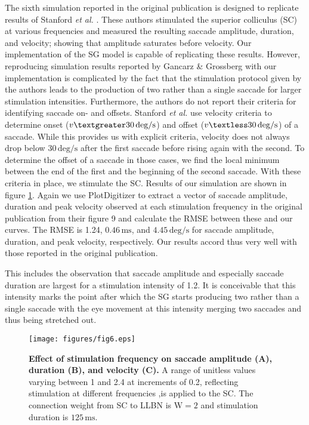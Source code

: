 \documentclass[10pt,a4paper,onecolumn]{article}
\renewcommand{\includegraphics}[2][]{\OldIncludegraphics[width=12cm, #1]{#2}}
\begin{document}
The sixth simulation reported in the original publication is designed to
replicate results of Stanford \textit{et al.} \autocite{Stanford1996}.
These authors stimulated the superior colliculus (SC) at various
frequencies and measured the resulting saccade amplitude, duration, and
velocity; showing that amplitude saturates before velocity. Our
implementation of the SG model is capable of replicating these results.
However, reproducing simulation results reported by Gancarz \& Grossberg
\autocite{Gancarz1998} with our implementation is complicated by the
fact that the stimulation protocol given by the authors leads to the
production of two rather than a single saccade for larger stimulation
intensities. Furthermore, the authors do not report their criteria for
identifying saccade on- and offsets. Stanford \textit{et al.}
\autocite{Stanford1996} use velocity criteria to determine onset
(\(v\textgreater30\,\mathrm{deg/s}\)) and offset
(\(v\textless30\,\mathrm{deg/s}\)) of a saccade. While this provides us
with explicit criteria, velocity does not always drop below
\(30\,\mathrm{deg/s}\) after the first saccade before rising again with
the second. To determine the offset of a saccade in those cases, we find
the local minimum between the end of the first and the beginning of the
second saccade. With these criteria in place, we stimulate the SC.
Results of our simulation are shown in figure \ref{fig:fig_6}. Again we
use PlotDigitizer to extract a vector of saccade amplitude, duration and
peak velocity observed at each stimulation frequency in the original
publication from their figure 9 and calculate the RMSE between these and
our curves. The RMSE is 1.24\textdegree, \(0.46\,\mathrm{ms}\), and
\(4.45\,\mathrm{deg/s}\) for saccade amplitude, duration, and peak
velocity, respectively. Our results accord thus very well with those
reported in the original publication. 

\pagebreak

This includes the observation that
saccade amplitude and especially saccade duration are largest for a
stimulation intensity of 1.2. It is conceivable that this intensity
marks the point after which the SG starts producing two rather than a
single saccade with the eye movement at this intensity merging two
saccades and thus being stretched out.

\begin{figure}
\centering
\texttt{[image: figures/fig6.eps]}
\caption{\textbf{Effect of stimulation frequency on saccade amplitude
(A), duration (B), and velocity (C).} A range of unitless values varying
between 1 and 2.4 at increments of 0.2, reflecting stimulation at
different frequencies ,is applied to the SC. The connection weight from
SC to LLBN is \(\mathrm{W=2}\) and stimulation duration is
\(125\,\mathrm{ms}\).\label{fig:fig_6}}
\end{figure}
\end{document}
